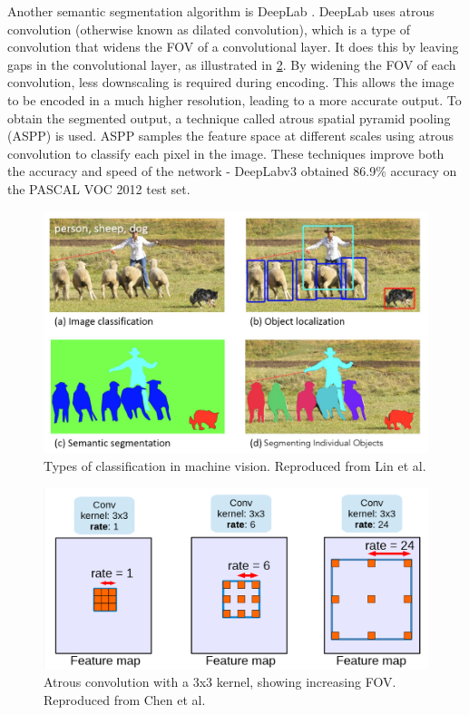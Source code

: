 Another semantic segmentation algorithm is DeepLab \cite{chenSemanticImageSegmentation2014}\cite{chenDeepLabSemanticImage2016}\cite{chenRethinkingAtrousConvolution2017}.
DeepLab uses atrous convolution (otherwise known as dilated convolution), which is a type of convolution that widens the FOV of a convolutional layer.
It does this by leaving gaps in the convolutional layer, as illustrated in \cref{fig:atrous_convolution}.
By widening the FOV of each convolution, less downscaling is required during encoding. This allows the image to be encoded in a much higher resolution,
leading to a more accurate output.
To obtain the segmented output, a technique called atrous spatial pyramid pooling (ASPP) is used. ASPP samples the feature space at different
scales using atrous convolution to classify each pixel in the image.
These techniques improve both the accuracy and speed of the network - DeepLabv3 obtained 86.9\% accuracy on the PASCAL VOC 2012 test set.

\begin{figure}[h]
    \centering
    \includegraphics[width=0.6\linewidth]{images/classification_types.png}
    \caption{Types of classification in machine vision. Reproduced from Lin et al. \cite{linMicrosoftCOCOCommon2014}}
    \label{fig:classification_types}
\end{figure}

\begin{figure}[b]
    \centering
    \includegraphics[width=0.6\linewidth]{images/atrous_convolution.png}
    \caption{Atrous convolution with a 3x3 kernel, showing increasing FOV. Reproduced from Chen et al. \cite{chenRethinkingAtrousConvolution2017}}
    \label{fig:atrous_convolution}
\end{figure}

